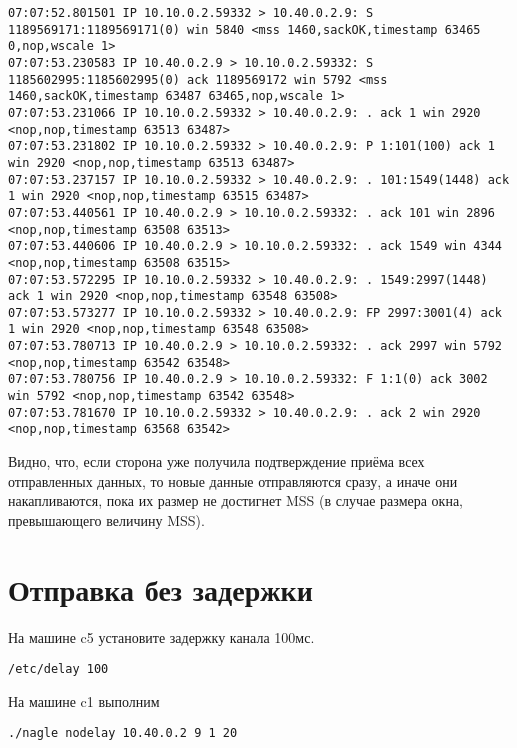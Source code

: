 \documentclass[a4paper,12pt]{article}
\begin{document}
\begin{Verbatim}
07:07:52.801501 IP 10.10.0.2.59332 > 10.40.0.2.9: S 1189569171:1189569171(0) win 5840 <mss 1460,sackOK,timestamp 63465 0,nop,wscale 1>
07:07:53.230583 IP 10.40.0.2.9 > 10.10.0.2.59332: S 1185602995:1185602995(0) ack 1189569172 win 5792 <mss 1460,sackOK,timestamp 63487 63465,nop,wscale 1>
07:07:53.231066 IP 10.10.0.2.59332 > 10.40.0.2.9: . ack 1 win 2920 <nop,nop,timestamp 63513 63487>
07:07:53.231802 IP 10.10.0.2.59332 > 10.40.0.2.9: P 1:101(100) ack 1 win 2920 <nop,nop,timestamp 63513 63487>
07:07:53.237157 IP 10.10.0.2.59332 > 10.40.0.2.9: . 101:1549(1448) ack 1 win 2920 <nop,nop,timestamp 63515 63487>
07:07:53.440561 IP 10.40.0.2.9 > 10.10.0.2.59332: . ack 101 win 2896 <nop,nop,timestamp 63508 63513>
07:07:53.440606 IP 10.40.0.2.9 > 10.10.0.2.59332: . ack 1549 win 4344 <nop,nop,timestamp 63508 63515>
07:07:53.572295 IP 10.10.0.2.59332 > 10.40.0.2.9: . 1549:2997(1448) ack 1 win 2920 <nop,nop,timestamp 63548 63508>
07:07:53.573277 IP 10.10.0.2.59332 > 10.40.0.2.9: FP 2997:3001(4) ack 1 win 2920 <nop,nop,timestamp 63548 63508>
07:07:53.780713 IP 10.40.0.2.9 > 10.10.0.2.59332: . ack 2997 win 5792 <nop,nop,timestamp 63542 63548>
07:07:53.780756 IP 10.40.0.2.9 > 10.10.0.2.59332: F 1:1(0) ack 3002 win 5792 <nop,nop,timestamp 63542 63548>
07:07:53.781670 IP 10.10.0.2.59332 > 10.40.0.2.9: . ack 2 win 2920 <nop,nop,timestamp 63568 63542>
\end{Verbatim}

Видно, что, если сторона уже получила подтверждение приёма всех отправленных
данных, то новые данные отправляются сразу, а иначе они накапливаются, пока их
размер не достигнет MSS (в случае размера окна, превышающего величину MSS).

\section{Отправка без задержки}

На машине c5 установите задержку канала 100мс.
\begin{Verbatim}
/etc/delay 100
\end{Verbatim}

На машине c1 выполним
\begin{Verbatim}
./nagle nodelay 10.40.0.2 9 1 20
\end{Verbatim}
\end{document}
